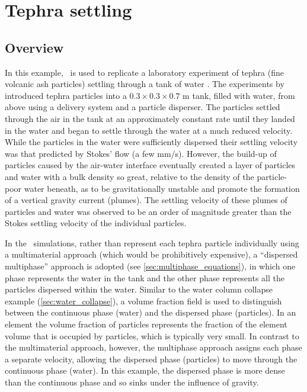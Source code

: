 
\section{Tephra settling}
\label{sec:tephra_settling}

\subsection{Overview}
In this example, \fluidity\ is used to replicate a laboratory experiment of tephra (fine volcanic ash particles) settling through a tank of water \citep{carey1997}. The experiments by \cite{carey1997} introduced tephra particles into a $0.3\times 0.3\times 0.7$ m tank, filled with water, from above using a delivery system and a particle disperser. The particles settled through the air in the tank at an approximately constant rate until they landed in the water and began to settle through the water at a much reduced velocity. While the particles in the water were sufficiently dispersed their settling velocity was that predicted by Stokes' flow (a few mm/s).  However, the build-up of particles caused by the air-water interface eventually created a layer of particles and water with a bulk density so great, relative to the density of the particle-poor water beneath, as to be gravitationally unstable and promote the formation of a vertical gravity current (plumes). The settling velocity of these plumes of 
particles 
and water was observed to be an order of magnitude greater than the Stokes settling velocity of the individual particles.

In the \fluidity\ simulations, rather than represent each tephra particle individually using a multimaterial approach (which would be prohibitively expensive), a ``dispersed multiphase'' approach is adopted (see \ref{sec:multiphase_equations}), in which one phase represents the water in the tank and the other phase represents all the particles dispersed within the water. Similar to the water column collapse example (\ref{sec:water_collapse}), a volume fraction field is used to distinguish between the continuous phase (water) and the dispersed phase (particles). In an element the volume fraction of particles represents the fraction of the element volume that is occupied by particles, which is typically very small. In contrast to the multimaterial approach, however, the multiphase approach assigns each phase a separate velocity, allowing the dispersed phase (particles) to move through the continuous phase (water). In this example, the dispersed phase is more dense than the continuous phase and so sinks under 
the influence of gravity.

